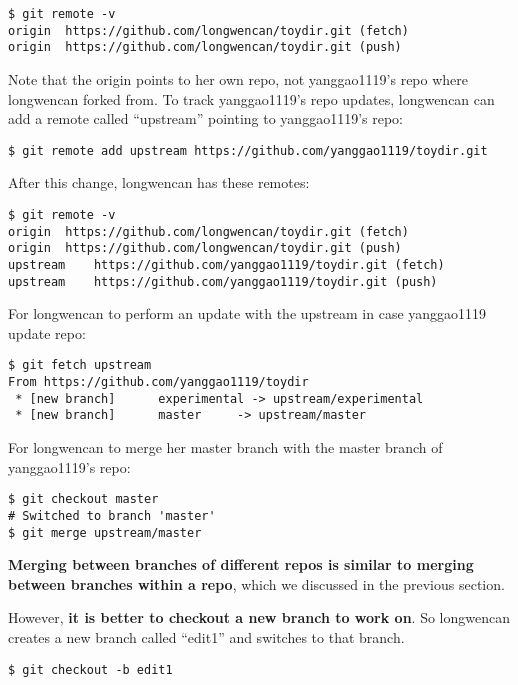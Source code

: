 \documentclass{article} %
\newcommand{\q}[1]{``#1''}
\begin{document}
\begin{lstlisting}
$ git remote -v
origin  https://github.com/longwencan/toydir.git (fetch)
origin  https://github.com/longwencan/toydir.git (push)
\end{lstlisting}

Note that the origin points to her own repo, not yanggao1119's repo where longwencan forked from. To track yanggao1119's repo updates, longwencan can add a remote called \q{upstream} pointing to yanggao1119's repo:

\begin{lstlisting}
$ git remote add upstream https://github.com/yanggao1119/toydir.git
\end{lstlisting}

After this change, longwencan has these remotes:

\begin{lstlisting}
$ git remote -v
origin  https://github.com/longwencan/toydir.git (fetch)
origin  https://github.com/longwencan/toydir.git (push)
upstream    https://github.com/yanggao1119/toydir.git (fetch)
upstream    https://github.com/yanggao1119/toydir.git (push)
\end{lstlisting}

For longwencan to perform an update with the upstream in case yanggao1119 update repo:

\begin{lstlisting}
$ git fetch upstream
From https://github.com/yanggao1119/toydir
 * [new branch]      experimental -> upstream/experimental
 * [new branch]      master     -> upstream/master
\end{lstlisting}

For longwencan to merge her master branch with the master branch of yanggao1119's repo:

\begin{lstlisting}
$ git checkout master
# Switched to branch 'master'
$ git merge upstream/master
\end{lstlisting}

\textbf{Merging between branches of different repos is similar to merging between branches within a repo}, which we discussed in the previous section.

However, \textbf{it is better to checkout a new branch to work on}. So longwencan creates a new branch called \q{edit1} and switches to that branch.

\begin{lstlisting}
$ git checkout -b edit1
\end{lstlisting}
\end{document}
